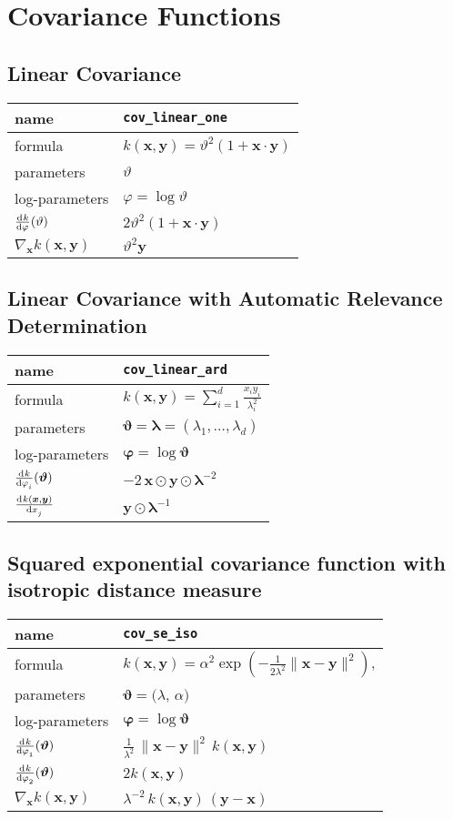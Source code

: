\documentclass{article}
\newcommand{\NL}{\\ \midrule} %
\newcommand{\bx}{\bm{x}}
\newcommand{\by}{\bm{y}}
\newcommand{\btheta}{\bm{\vartheta}}
\newcommand{\bphi}{\bm{\varphi}}
\begin{document}
\section{Covariance Functions}

\subsection{Linear Covariance}

\begin{tabularx}{\textwidth}{@{} X X @{}}
%
name & \verb|cov_linear_one| \NL 
 formula & $ k(\bx,\by) = \vartheta^2 (1+\bm{x}\cdot \bm{y}) $ \NL
% 
parameters & $\vartheta$  \NL
% 
log-parameters & $\varphi = \log \vartheta$  \NL
%
$\displaystyle \od{k}{\varphi}(\vartheta)$ & $ 2\vartheta^2 (1+\bm{x}\cdot \bm{y}) $ \NL 
%
$\displaystyle \nabla_{\bx} k(\bx, \by)$ & $ \vartheta^2 \by $ \NL 
\end{tabularx}






\subsection{Linear Covariance with Automatic Relevance Determination}


\begin{tabularx}{\textwidth}{@{} X X @{}}
%
name & \verb|cov_linear_ard|  \NL
 formula &  $\displaystyle  k(\bx,\by) = \sum_{i=1}^d \frac{ {x}_i {y}_i }{ \lambda_i^2 } $  \NL
% 
parameters & $\bm{\vartheta} = \bm{\lambda}=( \lambda_1,\ldots,\lambda_d ) $ \NL
% 
log-parameters & $\bphi= \log \btheta$  \NL
%
$\displaystyle \od{k}{\varphi_i}(\btheta)$ & $ \displaystyle -2 \,  \bx \odot \by \odot  \bm{\lambda}^{-2}  $ \NL 
%
%
$\displaystyle \od{k(\bx, \by)}{x_j}$ & $  \displaystyle    \by \odot  \bm{\lambda}^{-1} $ \NL 
\end{tabularx}







\subsection{Squared exponential covariance function with isotropic distance measure}

\begin{tabularx}{\textwidth}{@{} X X @{}}
%
name & \verb|cov_se_iso|  \NL
 formula &  $\displaystyle k(\bx,\by) = \alpha^2 \exp\left( -\frac{1}{2\lambda^2} \|\bm{x}-\bm{y}  \|^2 \right) $,  \NL
% 
parameters &  $\btheta = ( \lambda$, $\alpha)$ \NL
% 
log-parameters & $\bphi  = \log \btheta $ \NL
%
$\displaystyle \od{k}{\varphi_1}(\btheta)$ & $\displaystyle \frac{1}{\lambda^2}\,  \|\bx-\by\|^2 \, k(\bx,\by)$ \NL
$\displaystyle \od{k}{\varphi_2}(\btheta)$ & $2 k(\bx,\by)$ \NL
%
$\displaystyle \nabla_{\bx} k(\bx, \by)$ & $  \displaystyle  \lambda^{-2} \,  k(\bx,\by) \, (\by-\bx)  $ \NL 
\end{tabularx}
\end{document}
